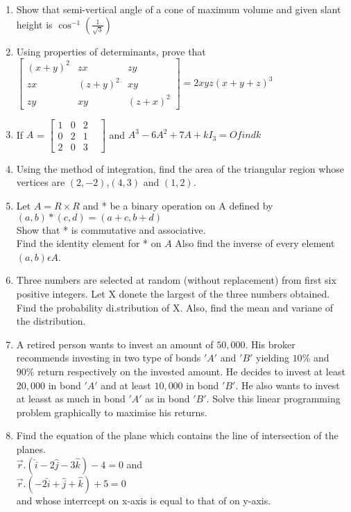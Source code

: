 \documentclass[12pt,-letter paper]{article}
\providecommand{\myvec}[1]{\ensuremath{\begin{bmatrix}#1\end{bmatrix}}}
\providecommand{\brak}[1]{\ensuremath{\left(#1\right)}}
\begin{document}
\begin{enumerate}
\item Show that semi-vertical angle of a cone of maximum volume and given slant height is $\cos^{-1}\brak{\frac{1}{\sqrt{3}}}$
\item Using properties of determinants, prove that \\
$\myvec{\brak{x+y}^2 & zx & zy \\zx & \brak{z+y}^2 & xy \\zy & xy & \brak{z+x}^2} = 2xyz\brak{x+y+z}^3$
\item If $A$ = $\myvec{1&0&2&\\0&2&1\\2&0&3&}$ and $A^3-6A^2+7A+kI_3 = O find k$
\item Using the method of integration, find the area of the triangular region whose vertices are $\brak{2, -2}$,$\brak{4, 3}$ and $\brak{1, 2}$.
\item Let $A=R \times R$ and * be a binary operation on A defined by \\ $\brak{a, b}*\brak{c, d}=\brak{a+c, b+d}$ \\ Show that * is commutative and associative. \\ Find the identity element for * on $A$ Also find the inverse of every element $\brak{a, b}\epsilon A$.
\item Three numbers are selected at random (without replacement) from first six positive integers. Let X donete the largest of the three numbers obtained. Find the probability di.stribution of X. Also, find the mean and variane of the distribution.
\item A retired person wants to invest an amount of \rupee $50,000$. His broker recommends investing in two type of bonds $'A'$ and $'B'$ yielding $10\%$ and $90\%$ return respectively on the invested amount. He decides to invest at least \rupee $20,000$ in bond $'A'$ and at least \rupee $10,000$ in bond $'B'$. He also wants to invest at leasst as much in bond $'A'$ as in bond $'B'$. Solve this linear  programming problem graphically to maximise his returns. 
\item Find the equation of the plane which contains the line of intersection of the planes. \\ $\overrightarrow{r}$.$\brak{\hat{i}-2\hat{j}-3\hat{k}}-4=0$ and \\ $\overrightarrow{r}$.$\brak{-2\hat{i}+\hat{j}+\hat{k}}+5=0$ \\ and whose interrcept on x-axis is equal to that of on y-axis.	

\end{enumerate}
\end{document}
